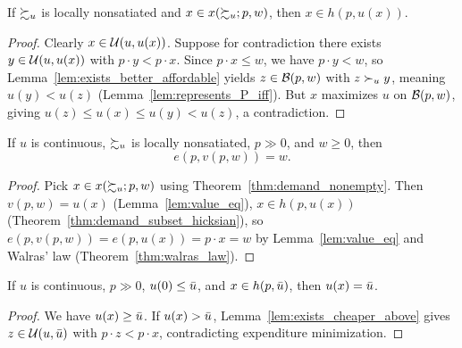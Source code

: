 \begin{theorem}
\label{thm:demand_subset_hicksian}
\leanok
{}
If $\succsim_u$ is locally nonsatiated and $x \in x(\succsim_u; p, w)$, then
$x \in h(p, u(x))$.
\end{theorem}
\begin{proof}
\leanok
Clearly $x \in \mathcal{U}(u, u(x))$. Suppose for contradiction there exists $y \in \mathcal{U}(u, u(x))$
with $p \cdot y < p \cdot x$. Since $p \cdot x \le w$, we have $p \cdot y < w$, so
Lemma~\ref{lem:exists_better_affordable} yields $z \in \mathcal{B}(p, w)$ with $z \succ_u y$,
meaning $u(y) < u(z)$ (Lemma~\ref{lem:represents_P_iff}). But $x$ maximizes $u$ on
$\mathcal{B}(p, w)$, giving $u(z) \le u(x) \le u(y) < u(z)$, a contradiction.
\end{proof}

\begin{theorem}[Duality identity $e(p, v(p, w)) = w$]
\label{thm:e_of_v}
\leanok
{}
If $u$ is continuous, $\succsim_u$ is locally nonsatiated, $p \gg 0$, and $w \ge 0$, then
\[
  e(p, v(p, w)) = w.
\]
\end{theorem}
\begin{proof}
\leanok
Pick $x \in x(\succsim_u; p, w)$ using Theorem~\ref{thm:demand_nonempty}. Then $v(p, w) = u(x)$
(Lemma~\ref{lem:value_eq}), $x \in h(p, u(x))$ (Theorem~\ref{thm:demand_subset_hicksian}),
so $e(p, v(p, w)) = e(p, u(x)) = p \cdot x = w$ by Lemma~\ref{lem:value_eq} and
Walras' law (Theorem~\ref{thm:walras_law}).
\end{proof}

\begin{proposition}
\label{thm:no_excess_utility}
\leanok
{}
If $u$ is continuous, $p \gg 0$, $u(0) \le \bar{u}$, and $x \in h(p, \bar{u})$, then $u(x) = \bar{u}$.
\end{proposition}
\begin{proof}
\leanok
We have $u(x) \ge \bar{u}$. If $u(x) > \bar{u}$, Lemma~\ref{lem:exists_cheaper_above} gives
$z \in \mathcal{U}(u, \bar{u})$ with $p \cdot z < p \cdot x$, contradicting expenditure minimization.
\end{proof}


